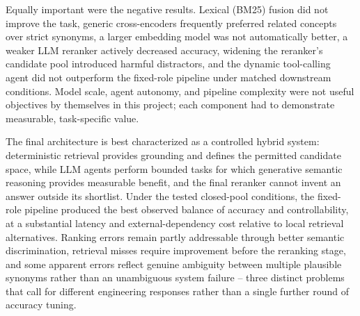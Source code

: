 Equally important were the negative results. Lexical (BM25) fusion did not improve the task, generic cross-encoders frequently preferred related concepts over strict synonyms, a larger embedding model was not automatically better, a weaker LLM reranker actively decreased accuracy, widening the reranker's candidate pool introduced harmful distractors, and the dynamic tool-calling agent did not outperform the fixed-role pipeline under matched downstream conditions. Model scale, agent autonomy, and pipeline complexity were not useful objectives by themselves in this project; each component had to demonstrate measurable, task-specific value.

The final architecture is best characterized as a controlled hybrid system: deterministic retrieval provides grounding and defines the permitted candidate space, while LLM agents perform bounded tasks for which generative semantic reasoning provides measurable benefit, and the final reranker cannot invent an answer outside its shortlist. Under the tested closed-pool conditions, the fixed-role pipeline produced the best observed balance of accuracy and controllability, at a substantial latency and external-dependency cost relative to local retrieval alternatives. Ranking errors remain partly addressable through better semantic discrimination, retrieval misses require improvement before the reranking stage, and some apparent errors reflect genuine ambiguity between multiple plausible synonyms rather than an unambiguous system failure -- three distinct problems that call for different engineering responses rather than a single further round of accuracy tuning.
